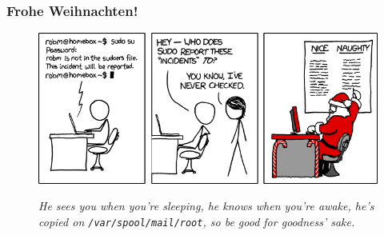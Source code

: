 \begin{frame}
	\frametitle{Frohe Weihnachten!}
	
	\begin{figure}[H]
		
		
		\includegraphics[width= \textwidth]{images/838_incident.png}
		
		\textit{\scriptsize{He sees you when you're sleeping, he knows when you're awake, he's copied on \texttt{/var/spool/mail/root}, so be good for goodness' sake.}}
		
	\end{figure}
\end{frame}


